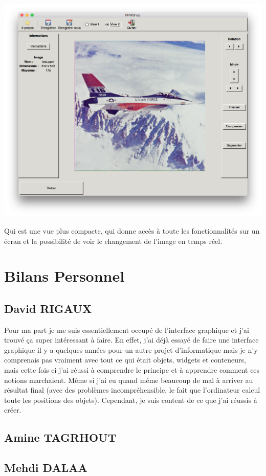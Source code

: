 \documentclass[12pt]{article}
\begin{document}
\begin{center}
\includegraphics[scale = 0.3]{view2}\\
\end{center}
Qui est une vue plus compacte, qui donne accès à toute les fonctionnalités sur un écran et la possibilité de voir le changement de l'image en temps réel. 
\section{Bilans Personnel}
\subsection{David RIGAUX}
Pour ma part je me suis essentiellement occupé de l'interface graphique et j'ai trouvé ça super intéressant à faire. En effet, j'ai déjà essayé de faire une interface graphique il y a quelques années pour un autre projet d'informatique mais je n'y comprenais pas vraiment avec tout ce qui était objets, widgets et conteneurs, mais cette fois ci j'ai réussi à comprendre le principe et à apprendre comment ces notions marchaient. Même si j'ai eu quand même beaucoup de mal à arriver au résultat final (avec des problèmes incompréhensible, le fait que l'ordinateur calcul toute les positions des objets). Cependant, je suis content de ce que j'ai réussis à créer.  
\subsection{Amine TAGRHOUT}
\subsection{Mehdi DALAA}
\end{document}
